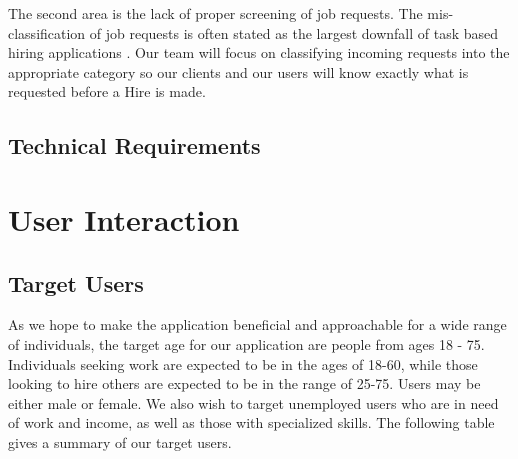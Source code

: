 \documentclass[11pt]{article}
\begin{document}
The second area is the lack of proper screening of job requests. 
The mis-classification of job requests is often stated as the largest downfall of task based hiring applications \cite{ThumbTack_sucks}. 
Our team will focus on classifying incoming requests into the appropriate category so our clients and our users will know exactly what is requested before a Hire is made.

\subsection{Technical Requirements}


%
\section{User Interaction}\label{user-interaction}

\subsection{Target Users}

As we hope to make the application beneficial and approachable for a wide range of individuals, the target age for our application are people from ages 18 - 75. Individuals seeking work are expected to be in the ages of 18-60, while those looking to hire others are expected to be in the range of 25-75. Users may be either male or female. We also wish to target unemployed users who are in need of work and income, as well as those with  specialized skills. The following table gives a summary of our target users.
\end{document}
